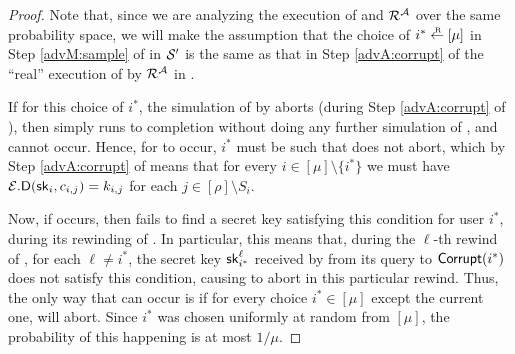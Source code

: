 \begin{proof}
  Note that, since we are analyzing the execution of \redM and \(\redR^{\advA}\) over the same probability space,
  we will make the assumption that the choice of \(i^{*} \sampleR [\mu]\) in Step \ref{advM:sample} of \redM in \(\mathcal{S}'\)
  is the same as that in Step \ref{advA:corrupt} of the ``real'' execution of \advA by \(\redR^{\advA}\) in \Simple.

  If for this choice of \(i^{*}\), the simulation of \advA by \redM aborts (during Step \ref{advA:corrupt} of \advA),
  then \redM simply runs \redR to completion without doing any further simulation of \advA, and  cannot occur.
  Hence, for  to occur, \(i^{*}\) must be such that \advA does not abort, which by Step \ref{advA:corrupt} of \advA
  means that for every \(i \in [\mu] \setminus \{i^{*}\}\) we must have \(\mathcal{E}.\mathsf{D}(\mathsf{sk}_{i}, c_{i,j}) = k_{i,j}\) for each \(j \in [\rho] \setminus S_{i}\).

  Now, if  occurs, then \redM fails to find a secret key satisfying this condition for user \(i^{*}\),
  during its rewinding of \advA.
  In particular, this means that, during the \(\ell\)-th rewind of \advA, for each \(\ell \ne i^{*}\),
  the secret key \(\mathsf{sk}_{i^{*}}^{\ell}\) received by \advA from its query to \(\mathsf{Corrupt}(i^{*})\)
  does not satisfy this condition, causing \advA to abort in this particular rewind.
  Thus, the only way that  can occur is if
  for every choice \(i^{*} \in [\mu]\) except the current one, \advA will abort.
  Since \(i^{*}\) was chosen uniformly at random from \([\mu]\),
  the probability of this happening is at most \(1/\mu\).


\end{proof}
